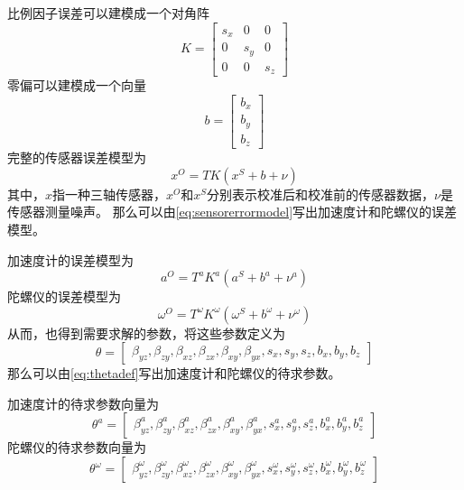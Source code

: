 \documentclass[
  type=master
]{gdutthesis}
\begin{document}
比例因子误差可以建模成一个对角阵
\begin{equation}\label{eq:scaleerror}
	K=
	\begin{bmatrix}
		s_x & 0 & 0\\
		0 & s_y & 0\\
		0 & 0 & s_z
	\end{bmatrix}
\end{equation}
零偏可以建模成一个向量
\begin{equation}\label{eq:scaleerror}
	b=
	\begin{bmatrix}
		b_x\\
		b_y\\
		b_z
	\end{bmatrix}
\end{equation}
完整的传感器误差模型为
\begin{equation}\label{eq:sensorerrormodel}
	x^O=T K (x^S + b + \nu)
\end{equation}
其中，$x$指一种三轴传感器，$x^O$和$x^S$分别表示校准后和校准前的传感器数据，$ν$是传感器测量噪声。
那么可以由\autoref{eq:sensorerrormodel}写出加速度计和陀螺仪的误差模型。

加速度计的误差模型为
\begin{equation}
	a^O=T^a K^a (a^S + b^a + \nu^a)
\end{equation}
陀螺仪的误差模型为
\begin{equation}\label{eq:accerrormodel}
	\omega^O=T^\omega K^\omega (\omega^S + b^\omega + \nu^\omega)
\end{equation}
从而，也得到需要求解的参数，将这些参数定义为
\begin{equation}\label{eq:thetadef}
	\theta = 
	\begin{bmatrix}
		\beta_{yz},\beta_{zy},\beta_{xz},\beta_{zx},\beta_{xy}, \beta_{yx},s_x,s_y,s_z,b_x,b_y,b_z
	\end{bmatrix}
\end{equation}
那么可以由\autoref{eq:thetadef}写出加速度计和陀螺仪的待求参数。

加速度计的待求参数向量为
\begin{equation}
	\theta^a = 
	\begin{bmatrix}
		\beta_{yz}^a,\beta_{zy}^a,\beta_{xz}^a,\beta_{zx}^a,\beta_{xy}^a, \beta_{yx}^a,s_x^a,s_y^a,s_z^a,b_x^a,b_y^a,b_z^a
	\end{bmatrix}
\end{equation}
陀螺仪的待求参数向量为
\begin{equation}
	\theta^\omega = 
	\begin{bmatrix}
		\beta_{yz}^\omega,\beta_{zy}^\omega,\beta_{xz}^\omega,\beta_{zx}^\omega,\beta_{xy}^\omega, \beta_{yx}^\omega,s_x^\omega,s_y^\omega,s_z^\omega,b_x^\omega,b_y^\omega,b_z^\omega
	\end{bmatrix}
\end{equation}
\end{document}
